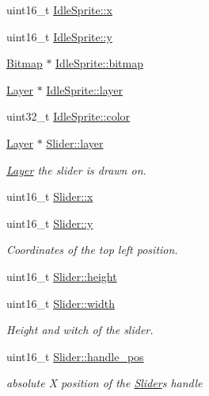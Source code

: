 \begin{DoxyCompactItemize}
uint16\+\_\+t \mbox{\hyperlink{group__sprite_gaccc6cfeb632527dbc79a1017f8f3a237}{Idle\+Sprite\+::x}}
\item 
uint16\+\_\+t \mbox{\hyperlink{group__sprite_ga63da8969e319d653ed0608c49056bcde}{Idle\+Sprite\+::y}}
\item 
\mbox{\hyperlink{struct_bitmap}{Bitmap}} $\ast$ \mbox{\hyperlink{group__sprite_ga43ec29869061c84e407f6351ce4e8efe}{Idle\+Sprite\+::bitmap}}
\item 
\mbox{\hyperlink{struct_layer}{Layer}} $\ast$ \mbox{\hyperlink{group__sprite_ga30536ca9bdfd98e84322bb2275f59d1a}{Idle\+Sprite\+::layer}}
\item 
uint32\+\_\+t \mbox{\hyperlink{group__sprite_gaf2cfbfe5f907f5f0abbd8d673bce19db}{Idle\+Sprite\+::color}}
\item 
\mbox{\hyperlink{struct_layer}{Layer}} $\ast$ \mbox{\hyperlink{group__sprite_gaed3e78bd2a3a88c5b0a02ff128d8dd85}{Slider\+::layer}}
\begin{DoxyCompactList}\small\item\em \mbox{\hyperlink{struct_layer}{Layer}} the slider is drawn on. \end{DoxyCompactList}\item 
uint16\+\_\+t \mbox{\hyperlink{group__sprite_ga3f0f16473e1534d0d73d917e6212b4f1}{Slider\+::x}}
\item 
uint16\+\_\+t \mbox{\hyperlink{group__sprite_ga4568c992e8bb68bfdf407242af502928}{Slider\+::y}}
\begin{DoxyCompactList}\small\item\em Coordinates of the top left position. \end{DoxyCompactList}\item 
uint16\+\_\+t \mbox{\hyperlink{group__sprite_gaa0b70313a61d3490712dc4c269e0bea4}{Slider\+::height}}
\item 
uint16\+\_\+t \mbox{\hyperlink{group__sprite_ga4ccd5dd9d8b0c329101310f2dd24fbe5}{Slider\+::width}}
\begin{DoxyCompactList}\small\item\em Height and witch of the slider. \end{DoxyCompactList}\item 
uint16\+\_\+t \mbox{\hyperlink{group__sprite_gac1256085ee6a3241fb177a28befc0eef}{Slider\+::handle\+\_\+pos}}
\begin{DoxyCompactList}\small\item\em absolute X position of the \mbox{\hyperlink{struct_slider}{Slider}}\textquotesingle{}s handle \end{DoxyCompactList}\item 

\end{DoxyCompactItemize}
